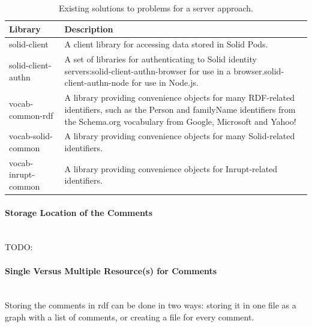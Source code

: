 \begin{table}[h!]
    \centering
    \begin{tabular}{| l | p{11cm} |} 
    \hline
     Library & Description \\
     \hline
      solid-client & A client library for accessing data stored in Solid Pods.  \\
      \hline
      solid-client-authn & A set of libraries for authenticating to Solid identity servers:solid-client-authn-browser for use in a browser.solid-client-authn-node for use in Node.js.  \\
      \hline
      vocab-common-rdf & A library providing convenience objects for many RDF-related identifiers, such as the Person and familyName identifiers from the Schema.org vocabulary from Google, Microsoft and Yahoo!  \\
      \hline
      vocab-solid-common & A library providing convenience objects for many Solid-related identifiers.  \\
      \hline
      vocab-inrupt-common & A library providing convenience objects for Inrupt-related identifiers.  \\
      \hline
    \end{tabular}
    \vspace{0.75cm}
    \caption{Existing solutions to problems for a server approach.}
    \label{table:4}
\end{table}
\vspace{0.5cm}
\paragraph{Storage Location of the Comments}\mbox{}\\

TODO: 

\vspace{0.5cm}
\paragraph{Single Versus Multiple Resource(s) for Comments}\mbox{}\\
Storing the comments in \gls{rdf} can be done in two ways: storing it in one file as a graph with a list of comments, or creating a file for every comment.

